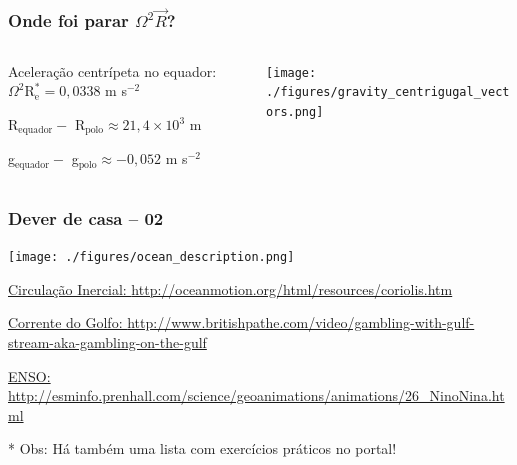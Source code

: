 \begin{frame}
  \frametitle{Onde foi parar $\Omega^2\vec{R}$?}

  \begin{columns}
    \begin{column}{0.5\textwidth}
    \small{
      Aceleração centrípeta no equador:
      $\Omega^2\text{R}_{\text{e}}^{*} = 0,0338$ m s$^{-2}$

      R$_{\text{equador}} -$ R$_{\text{polo}} \approx 21,4 \times 10^{3}$ m

      g$_{\text{equador}} -$ g$_{\text{polo}} \approx -0,052$ m s$^{-2}$
      }
    \end{column}
    \begin{column}{0.5\textwidth}
      \begin{center}
        \texttt{[image: ./figures/gravity\_centrigugal\_vectors.png]}
      \end{center}
    \end{column}
  \end{columns}
\end{frame}


\begin{frame}
  \frametitle{Dever de casa -- 02}
  \begin{center}
    \texttt{[image: ./figures/ocean\_description.png]}
  \end{center}

\scriptsize{

\href{http://oceanmotion.org/html/resources/coriolis.htm}{Circulação Inercial: \url{http://oceanmotion.org/html/resources/coriolis.htm}}

\href{http://www.britishpathe.com/video/gambling-with-gulf-stream-aka-gambling-on-the-gulf}{Corrente do Golfo: \url{http://www.britishpathe.com/video/gambling-with-gulf-stream-aka-gambling-on-the-gulf}}

\href{http://esminfo.prenhall.com/science/geoanimations/animations/26_NinoNina.html}{ENSO: \url{http://esminfo.prenhall.com/science/geoanimations/animations/26_NinoNina.html}}

}

* Obs: Há também uma lista com exercícios práticos no portal!
\end{frame}


